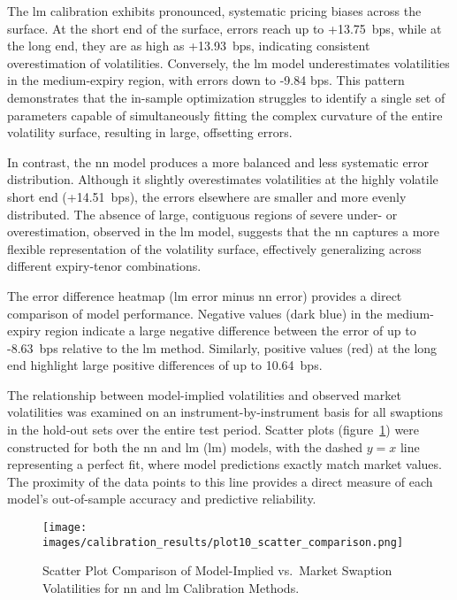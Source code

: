The \ac{lm} calibration exhibits pronounced, systematic pricing biases across the surface. At the short end of the surface, errors reach up to +13.75~\ac{bps}, while at the long end, they are as high as +13.93~\ac{bps}, indicating consistent overestimation of volatilities. Conversely, the \ac{lm} model underestimates volatilities in the medium-expiry region, with errors down to -9.84 \ac{bps}. This pattern demonstrates that the in-sample optimization struggles to identify a single set of parameters capable of simultaneously fitting the complex curvature of the entire volatility surface, resulting in large, offsetting errors.

In contrast, the \ac{nn} model produces a more balanced and less systematic error distribution. Although it slightly overestimates volatilities at the highly volatile short end (+14.51~\ac{bps}), the errors elsewhere are smaller and more evenly distributed. The absence of large, contiguous regions of severe under- or overestimation, observed in the \ac{lm} model, suggests that the \ac{nn} captures a more flexible representation of the volatility surface, effectively generalizing across different expiry-tenor combinations.

The error difference heatmap (\ac{lm} error minus \ac{nn} error) provides a direct comparison of model performance. Negative values (dark blue) in the medium-expiry region indicate a large negative difference between the error of up to -8.63~\ac{bps} relative to the \ac{lm} method. Similarly, positive values (red) at the long end highlight large positive differences of up to 10.64~\ac{bps}.

The relationship between model-implied volatilities and observed market volatilities was examined on an instrument-by-instrument basis for all swaptions in the hold-out sets over the entire test period. Scatter plots (figure~\ref{fig:scatter_comparison}) were constructed for both the \ac{nn} and \ac{lm} (\ac{lm}) models, with the dashed \(y=x\) line representing a perfect fit, where model predictions exactly match market values. The proximity of the data points to this line provides a direct measure of each model's out-of-sample accuracy and predictive reliability.

\begin{figure}[H]
	\centering
	\texttt{[image: images/calibration\_results/plot10\_scatter\_comparison.png]}
	\caption{Scatter Plot Comparison of Model-Implied vs.\ Market Swaption Volatilities for \ac{nn} and \ac{lm} Calibration Methods.}
	\label{fig:scatter_comparison}
\end{figure}

